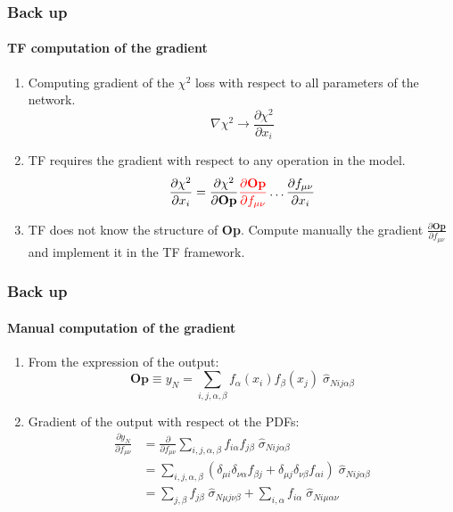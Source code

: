 \documentclass[aspectratio=43]{beamer}
\begin{document}
\begin{frame}

	\frametitle{Back up}
	\framesubtitle{TF computation of the gradient}
	
	\begin{enumerate} 
		\item Computing gradient of the $\chi^{2}$ loss with respect to all parameters of the network.
		\begin{equation}
			\nabla \chi^{2} \longrightarrow \frac{\partial \chi^{2}}{\partial x_{i}} \nonumber
		\end{equation}
		\item TF requires the gradient with respect to any operation in the model.
		\begin{equation}
			\frac{\partial \chi^{2}}{\partial x_{i}} =
			\frac{\partial \chi^{2}}{\partial \textbf{Op}}
			{\color{red}\frac{\partial \textbf{Op}}{\partial f_{\mu \nu}}} \ldots
			\frac{\partial f_{\mu \nu}}{\partial x_{i}} \nonumber
		\end{equation}
		\item TF does not know the structure of \textbf{Op}. Compute manually the gradient $\frac{\partial \textbf{Op}}{\partial f_{\mu \nu}}$ and implement it in the TF framework.
	\end{enumerate}

\end{frame}

\begin{frame}

	\frametitle{Back up}
	\framesubtitle{Manual computation of the gradient}
	
	\begin{enumerate}
	\item From the expression of the output:
	\begin{equation}
		\textbf{Op} \equiv y_{N} = \sum_{i, j, \alpha, \beta} f_{\alpha}(x_{i}) f_{\beta}(x_{j}) \; \hat{\sigma}_{N i j \alpha \beta} \nonumber
	\end{equation}
	\item Gradient of the output with respect ot the PDFs:
	\begin{align}
		\frac{\partial y_{N}}{\partial f_{\mu \nu}} &=
		\frac{\partial}{\partial f_{\mu \nu}} \sum_{i, j, \alpha, \beta} f_{i \alpha} f_{j \beta} \; \hat{\sigma}_{N i j \alpha \beta} \nonumber \\
		&= \sum_{i, j, \alpha, \beta} (\delta_{\mu i} \delta_{\nu \alpha} f_{\beta j} + \delta_{\mu j} \delta_{\nu \beta} f_{\alpha i})
		\; \hat{\sigma}_{N i j \alpha \beta} \nonumber \\
		&= \sum_{j, \beta} f_{j \beta} \; \hat{\sigma}_{N \mu j \nu \beta} + \sum_{i, \alpha} f_{i \alpha} \; \hat{\sigma}_{N i \mu \alpha \nu} \nonumber
	\end{align}
\end{enumerate}

\end{frame}
\end{document}

